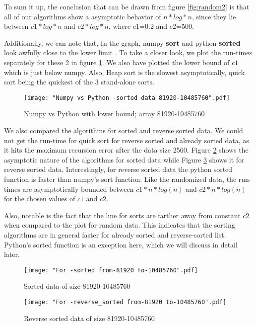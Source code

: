 \documentclass[sigconf, nonacm, natbib, screen, balance=False]{acmart}
\begin{document}
To sum it up, the conclusion that can be drawn from figure \ref{fig:random2} is that all of our algorithms show a asymptotic behavior of $n*log*n$, since they lie between $c1*log*n$ and $c2*log*n$, where c1=0.2 and c2=500. 

Additionally, we can note that, In the graph, numpy \textbf{sort} and python \textbf{sorted} look awfully close to the lower limit . To take a closer look, we plot the run-times separately for these 2 in  figure \ref{fig:numpyvspython}. We also have plotted the lower bound of $c1$ which is just below numpy. Also, Heap sort is the slowest asymptotically, quick sort being the quickest of the 3 stand-alone sorts.

\begin{figure}[ht]
\texttt{[image: "Numpy vs Python -sorted data 81920-10485760".pdf]}
    \caption{Numpy vs Python with lower bound; array 81920-10485760 }
    \label{fig:numpyvspython}
\end{figure}

We also compared the algorithms for sorted and reverse sorted data. We could not get the run-time for quick sort for reverse sorted and already sorted data, as it hits the maximum recursion error after the data size 2560. Figure \ref{fig:sorted1} shows the asymptotic nature of the algorithms for sorted data while Figure \ref{fig:rsorted1} shows it for reverse sorted data. \newline
Interestingly, for reverse sorted data the python sorted function is faster than numpy's sort function. Like the randomized data, the run-times are asymptotically bounded between $c1*n*log(n)$  and $c2*n*log(n)$ for the chosen values of $c1$ and $c2$.

Also, notable is the fact that the line for sorts are farther away from constant $c2$ when compared to the plot for random data. This indicates that the sorting algorithms are in general faster for already sorted and reverse-sorted list. Python's sorted function is an exception here, which we will discuss in detail later.

\begin{figure}[ht]
\texttt{[image: "For -sorted from-81920 to-10485760".pdf]}
    \caption{Sorted data of size 81920-10485760 }
    \label{fig:sorted1}
\end{figure}

\begin{figure}[ht]
\texttt{[image: "For -reverse\_sorted from-81920 to-10485760".pdf]}
    \caption{Reverse sorted data of size 81920-10485760 }
    \label{fig:rsorted1}
\end{figure}
\end{document}
